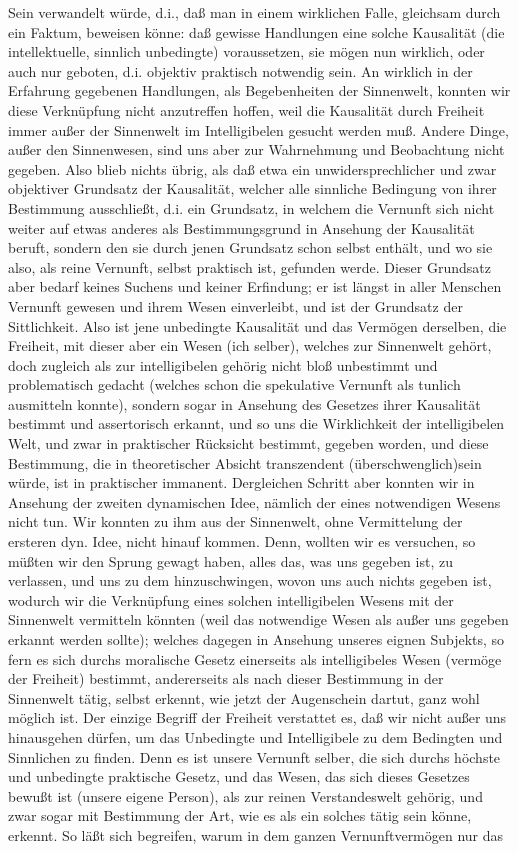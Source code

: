 \documentclass[a4paper,12pt,twoside]{book}
\begin{document}
Sein verwandelt würde, d.i., daß man in einem wirklichen Falle, gleichsam durch ein Faktum, beweisen könne: daß gewisse Handlungen eine solche Kausalität (die intellektuelle, sinnlich unbedingte) voraussetzen, sie mögen nun wirklich, oder auch nur geboten, d.i. objektiv praktisch notwendig sein. An wirklich in der Erfahrung  gegebenen Handlungen, als Begebenheiten der Sinnenwelt, konnten wir diese Verknüpfung nicht anzutreffen hoffen, weil die Kausalität durch Freiheit immer außer der Sinnenwelt im Intelligibelen gesucht werden muß. Andere Dinge, außer den Sinnenwesen, sind uns aber zur Wahrnehmung und Beobachtung nicht gegeben. Also blieb nichts übrig, als daß etwa ein unwidersprechlicher und zwar objektiver Grundsatz der Kausalität, welcher alle sinnliche Bedingung von ihrer Bestimmung ausschließt, d.i. ein Grundsatz, in welchem die Vernunft sich nicht weiter auf etwas anderes als Bestimmungsgrund in Ansehung der Kausalität beruft, sondern den sie durch jenen Grundsatz schon selbst enthält, und wo sie also, als reine Vernunft, selbst praktisch ist, gefunden werde. Dieser Grundsatz aber bedarf keines Suchens und keiner Erfindung; er ist längst in aller Menschen Vernunft gewesen und ihrem Wesen einverleibt, und ist der Grundsatz der Sittlichkeit. Also ist jene unbedingte Kausalität und das Vermögen derselben, die Freiheit, mit dieser aber ein Wesen (ich selber), welches zur Sinnenwelt gehört, doch zugleich als zur intelligibelen gehörig nicht bloß unbestimmt und problematisch gedacht (welches schon die spekulative Vernunft als tunlich ausmitteln konnte), sondern sogar in Ansehung des Gesetzes ihrer Kausalität bestimmt und assertorisch erkannt, und so uns die Wirklichkeit der intelligibelen Welt, und zwar in praktischer Rücksicht bestimmt, gegeben worden, und diese Bestimmung, die in theoretischer Absicht transzendent (überschwenglich)sein würde, ist in praktischer immanent. Dergleichen Schritt aber konnten wir in Ansehung der zweiten dynamischen Idee, nämlich der eines notwendigen Wesens nicht tun. Wir konnten zu ihm aus der Sinnenwelt, ohne Vermittelung der ersteren dyn. Idee, nicht hinauf kommen. Denn, wollten wir es versuchen, so müßten wir den Sprung gewagt haben, alles das, was uns gegeben ist, zu verlassen, und uns zu dem hinzuschwingen, wovon uns auch nichts gegeben ist, wodurch wir die Verknüpfung eines solchen intelligibelen Wesens mit der Sinnenwelt vermitteln könnten (weil das notwendige Wesen als außer uns gegeben  erkannt werden sollte); welches dagegen in Ansehung unseres eignen Subjekts, so fern es sich durchs moralische Gesetz einerseits als intelligibeles Wesen (vermöge der Freiheit) bestimmt, andererseits als nach dieser Bestimmung in der Sinnenwelt tätig, selbst erkennt, wie jetzt der Augenschein dartut, ganz wohl möglich ist. Der einzige Begriff der Freiheit verstattet es, daß wir nicht außer uns hinausgehen dürfen, um das Unbedingte und Intelligibele zu dem Bedingten und Sinnlichen zu finden. Denn es ist unsere Vernunft selber, die sich durchs höchste und unbedingte praktische Gesetz, und das Wesen, das sich dieses Gesetzes bewußt ist (unsere eigene Person), als zur reinen Verstandeswelt gehörig, und zwar sogar mit Bestimmung der Art, wie es als ein solches tätig sein könne, erkennt. So läßt sich begreifen, warum in dem ganzen Vernunftvermögen nur das 
\end{document}
